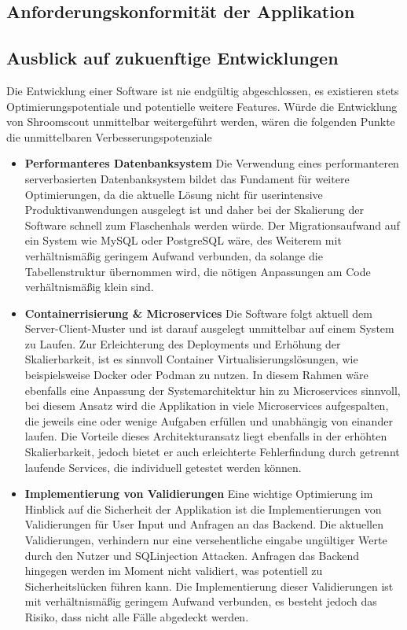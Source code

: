 \documentclass[../main.tex]{subfiles}
\begin{document}
\subsection{Anforderungskonformität der Applikation}
\subsection{Ausblick auf zukuenftige Entwicklungen}
Die Entwicklung einer Software ist nie endgültig abgeschlossen, es existieren stets Optimierungspotentiale und potentielle weitere Features.
Würde die Entwicklung von Shroomscout unmittelbar weitergeführt werden, wären die folgenden Punkte die unmittelbaren Verbesserungspotenziale

\begin{itemize}

    \item \textbf{Performanteres Datenbanksystem}
        Die Verwendung eines performanteren serverbasierten Datenbanksystem bildet das Fundament für weitere Optimierungen, da die aktuelle Lösung nicht für userintensive
        Produktivanwendungen ausgelegt ist und daher bei der Skalierung der Software schnell zum Flaschenhals werden würde. Der Migrationsaufwand auf ein System wie MySQL oder PostgreSQL
        wäre, des Weiterem mit verhältnismäßig geringem Aufwand verbunden, da solange die Tabellenstruktur übernommen wird, die nötigen Anpassungen am Code verhältnismäßig klein sind. 

	\item \textbf{Containerrisierung \& Microservices}
	    Die Software folgt aktuell dem Server-Client-Muster und ist darauf ausgelegt unmittelbar auf einem System zu Laufen.
        Zur Erleichterung des Deployments und Erhöhung der Skalierbarkeit, ist es sinnvoll Container Virtualisierungslösungen, wie beispielsweise Docker oder Podman zu nutzen.
        In diesem Rahmen wäre ebenfalls eine Anpassung der Systemarchitektur hin zu Microservices sinnvoll, bei diesem Ansatz wird die Applikation in viele Microservices aufgespalten,
        die jeweils eine oder wenige Aufgaben erfüllen und unabhängig von einander laufen. Die Vorteile dieses Architekturansatz liegt ebenfalls in der erhöhten Skalierbarkeit, jedoch
        bietet er auch erleichterte Fehlerfindung durch getrennt laufende Services, die individuell getestet werden können.
        
  \item \textbf{Implementierung von Validierungen}
        Eine wichtige Optimierung im Hinblick auf die Sicherheit der Applikation ist die Implementierungen von Validierungen für User Input und Anfragen an das Backend.
        Die aktuellen Validierungen, verhindern nur eine versehentliche eingabe ungültiger Werte durch den Nutzer und SQLinjection Attacken. Anfragen das Backend hingegen werden
        im Moment nicht validiert, was potentiell zu Sicherheitslücken führen kann. Die Implementierung dieser Validierungen ist mit verhältnismäßig geringem Aufwand verbunden,
        es besteht jedoch das Risiko, dass nicht alle Fälle abgedeckt werden.


\end{itemize}
\end{document}
